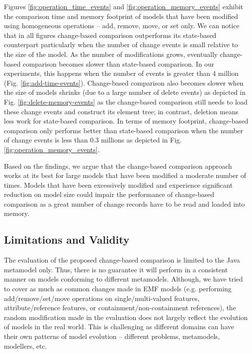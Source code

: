 Figures \ref{fig:operation_time_events} and \ref{fig:operation_memory_events} exhibit the comparison time and memory footprint of models that have been modified using homogeneous operations -- \textsf{add}, \textsf{remove}, \textsf{move}, or \textsf{set} only. We can notice that in all figures change-based comparison outperforms its state-based counterpart particularly when the number of change events is small relative to the size of the model. As the number of modifications grows, eventually change-based comparison becomes slower than state-based comparison. In our experiments, this happens when the number of events is greater than 4 million (Fig. \ref{fig:add-time-events}). Change-based comparison also becomes slower when the size of models shrinks (due to a large number of delete events) as depicted in Fig. \ref{fig:delete-memory-events} as the change-based comparison still needs to load these change events and construct its element tree; in contrast, deletion means less work for state-based comparison. In terms of memory footprint, change-based comparison only performs better than state-based comparison when the number of change events is less than 0.3 millions as depicted in Fig. \ref{fig:operation_memory_events}.

Based on the findings, we argue that the change-based comparison approach works at its best for large models that have been modified a moderate number of times. Models that have been excessively modified and experience significant reduction on model size could impair the performance of change-based comparison as a great number of change records have to be read and loaded into memory. 

\subsection{Limitations and Validity}
\label{sec:limitation_and_Threat_to_validity}
The evaluation of the proposed change-based comparison is limited to the Java metamodel only. Thus, there is no guarantee it will perform in a consistent manner on models conforming to different metamodels. Although, we have tried to cover as much as common changes made in EMF models (e.g. performing \textsf{add}/\textsf{remove}/\textsf{set}/\textsf{move} operations on \textsf{single}/\textsf{multi}-\textsf{valued} features, \textsf{attribute}/\textsf{reference} features, or \textsf{containment}/\textsf{non}-\textsf{containment} references), the random modification made in the evaluation does not largely reflect the evolution of models in the real world. This is challenging as different domains can have their own patterns of model evolution -- different problems, metamodels, modellers, etc.

